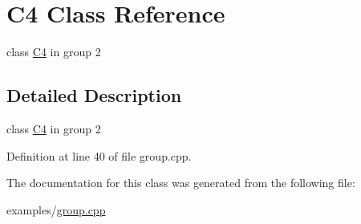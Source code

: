 \hypertarget{class_c4}{}\section{C4 Class Reference}
\label{class_c4}


class \mbox{\hyperlink{class_c4}{C4}} in group 2  




\subsection{Detailed Description}
class \mbox{\hyperlink{class_c4}{C4}} in group 2 

Definition at line 40 of file group.\+cpp.



The documentation for this class was generated from the following file\+:\begin{DoxyCompactItemize}
\item 
examples/\mbox{\hyperlink{group_8cpp}{group.\+cpp}}\end{DoxyCompactItemize}
